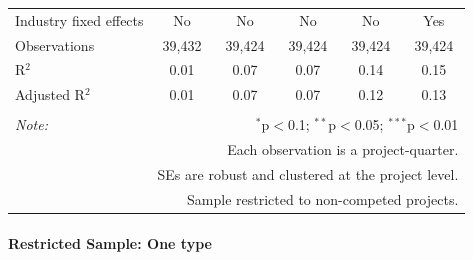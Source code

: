 \documentclass[
]{article}
\begin{document}
\begin{table}[H]
\begin{tabular}{@{\extracolsep{-2pt}}lccccc}
Industry fixed effects & No & No & No & No & Yes \\ 
Observations & 39,432 & 39,424 & 39,424 & 39,424 & 39,424 \\ 
R$^{2}$ & 0.01 & 0.07 & 0.07 & 0.14 & 0.15 \\ 
Adjusted R$^{2}$ & 0.01 & 0.07 & 0.07 & 0.12 & 0.13 \\ 
\hline 
\hline \\[-1.8ex] 
\textit{Note:}  & \multicolumn{5}{r}{$^{*}$p$<$0.1; $^{**}$p$<$0.05; $^{***}$p$<$0.01} \\ 
 & \multicolumn{5}{r}{Each observation is a project-quarter.} \\ 
 & \multicolumn{5}{r}{SEs are robust and clustered at the project level.} \\ 
 & \multicolumn{5}{r}{Sample restricted to non-competed projects.} \\ 
\end{tabular} 
\end{table}

\hypertarget{restricted-sample-one-type-2}{%
\paragraph{Restricted Sample: One
type}\label{restricted-sample-one-type-2}}
\end{document}
